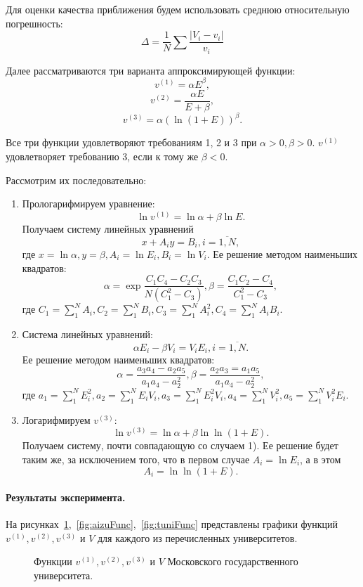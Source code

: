 Для оценки качества приближения будем использовать среднюю относительную погрешность:
\[
\Delta = \frac{1}{N} \sum \frac{\lvert V_i - v_i \rvert}{v_i}
\]

Далее рассматриваются три варианта аппроксимирующей функции:
\[v^{(1)} = \alpha E^\beta ,\]
\[v^{(2)} = \frac{\alpha E}{E + \beta},\]
\[v^{(3)} = \alpha (\ln(1 + E))^\beta .\]

Все три функции удовлетворяют требованиям 1, 2 и 3 при \(\alpha > 0, \beta > 0\). \(v^{(1)}\) удовлетворяет требованию 3, если к тому же  \(\beta < 0\).

Рассмотрим их последовательно:

\begin{enumerate}
	\item Прологарифмируем уравнение: \[\ln v^{(1)} = \ln \alpha + \beta \ln E .\] Получаем систему линейных уравнений \[x + A_i y = B_i, i = \overline{1,N} ,\] где \(x = \ln \alpha, y = \beta, A_i = \ln E_i, B_i = \ln V_i\). Ее решение методом наименьших квадратов: \[\alpha = \exp \frac{C_1C_4 - C_2C_3}{N(C_1^2 - C_3)}, \beta = \frac{C_1C_2 - C_4}{C_1^2 - C_3},\] где \(C_1 = \sum_{1}^{N}A_i, C_2 = \sum_{1}^{N}B_i, C_3 = \sum_{1}^{N}A_i^2, C_4 = \sum_{1}^{N}A_i B_i\).
	\item Система линейных уравнений: \[\alpha E_i - \beta V_i = V_i E_i, i = \overline{1,N}.\] Ее решение методом наименьших квадратов: \[\alpha = \frac{a_3 a_4 - a_2 a_5}{a_1 a_4 - a_2^2}, \beta = \frac{a_2 a_3 = a_1 a_5}{a_1 a_4 - a_2^2}, \] где \(a_1 = \sum_{1}^{N} E_i^2, a_2 = \sum_{1}^{N} E_i V_i, a_3 = \sum_{1}^{N} E_i^2 V_i, a_4 = \sum_{1}^{N} V_i^2, a_5 = \sum_{1}^{N} V_i^2 E_i\).
	\item Логарифмируем \(v^{(3)}\): \[\ln v^{(3)} = \ln \alpha + \beta \ln \ln (1 + E).\] Получаем систему, почти совпадающую со случаем 1). Ее решение будет таким же, за исключением того, что в первом случае \(A_i = \ln E_i\), а в этом \[A_i = \ln \ln (1+E).\]
\end{enumerate}

\paragraph{Результаты эксперимента.} На рисунках~\cref{fig:msuFunc},~\cref{fig:aizuFunc},~\cref{fig:tuniFunc} представлены графики функций \(v^{(1)}, v^{(2)}, v^{(3)}\) и \(V\) для каждого из перечисленных университетов.

\begin{figure}[ht]
	\caption{Функции \(v^{(1)}, v^{(2)}, v^{(3)}\) и \(V\) Московского государственного университета.}\label{fig:msuFunc}
\end{figure}

